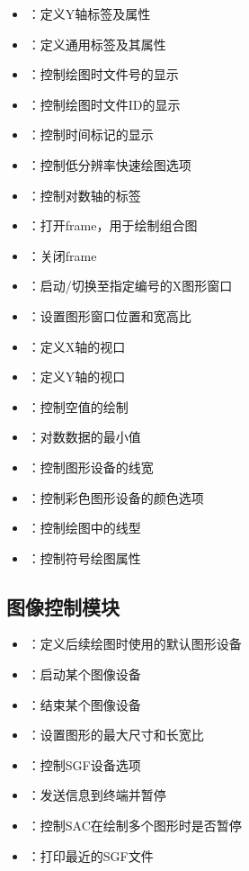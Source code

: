 \begin{itemize}
\item {}：定义Y轴标签及属性
\item {}：定义通用标签及其属性
\item {}：控制绘图时文件号的显示
\item {}：控制绘图时文件ID的显示
\item {}：控制时间标记的显示
\item {}：控制低分辨率快速绘图选项
\item {}：控制对数轴的标签
\item {}：打开frame，用于绘制组合图
\item {}：关闭frame
\item {}：启动/切换至指定编号的X图形窗口
\item {}：设置图形窗口位置和宽高比
\item {}：定义X轴的视口
\item {}：定义Y轴的视口
\item {}：控制空值的绘制
\item {}：对数数据的最小值
\item {}：控制图形设备的线宽
\item {}：控制彩色图形设备的颜色选项
\item {}：控制绘图中的线型
\item {}：控制符号绘图属性
\end{itemize}

\subsection*{图像控制模块}
\begin{itemize}
\item {}：定义后续绘图时使用的默认图形设备
\item {}：启动某个图像设备
\item {}：结束某个图像设备
\item {}：设置图形的最大尺寸和长宽比
\item {}：控制SGF设备选项
\item {}：发送信息到终端并暂停
\item {}：控制SAC在绘制多个图形时是否暂停
\item {}：打印最近的SGF文件
\end{itemize}

